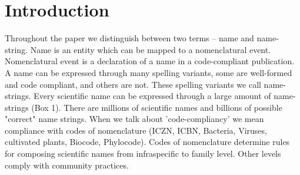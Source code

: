 \documentclass{bmcart}
\begin{document}
\begin{frontmatter}
\begin{abstractbox}

\begin{keyword}
\end{keyword}


\end{abstractbox}
%

\end{frontmatter}



\section*{Introduction}

Throughout the paper we distinguish between two terms -- name and name-string.
Name is an entity which can be mapped to a nomenclatural event. Nomenclatural
event is a declaration of a name in a code-compliant publication. A name can be
expressed through many spelling variants, some are well-formed and code
compliant, and others are not. These spelling variants we call name-strings.
Every scientific name can be expressed through a large amount of name-strings
(Box 1).  There are millions of scientific names and billions of possible
"correct" name strings. When we talk about 'code-compliancy' we mean compliance
with codes of nomenclature (ICZN, ICBN, Bacteria, Viruses, cultivated plants,
Biocode, Phylocode). Codes of nomenclature determine rules for composing
scientific names from infraspecific to family level. Other levels comply with
community practices.  
\end{document}
